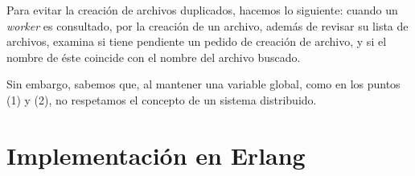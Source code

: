 \documentclass[a4paper, 8pt]{article}
\begin{document}
\begin{enumerate}
    Para evitar la creación de archivos duplicados, hacemos lo siguiente:
    cuando un \textit{worker} es consultado, por la creación de un archivo, además de revisar su lista de archivos, examina si tiene pendiente un pedido de creación de archivo,
    y si el nombre de éste coincide con el nombre del archivo buscado.
    
    
    
    
    
  \end{enumerate}
  
  Sin embargo, sabemos que, al mantener una variable global, como en los puntos (1) y (2), no respetamos el concepto de un sistema distribuido.


\section{Implementación en Erlang}
\end{document}
